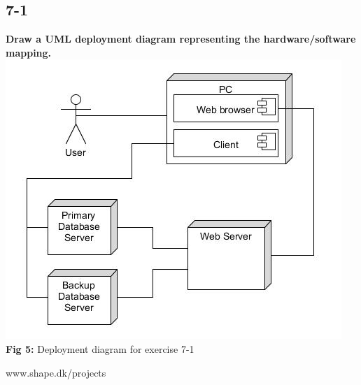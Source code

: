 \documentclass[12pt]{article}
\begin{document}
\newpage
\subsection*{7-1}
\textbf{Draw a UML deployment diagram representing the hardware/software mapping.}\\

\includegraphics[scale=0.7]{7-1}\\
\textbf{Fig 5:} Deployment diagram for exercise 7-1







\newpage

\begin{thebibliography}{9}

  www.shape.dk/projects

\end{thebibliography}
\end{document}
